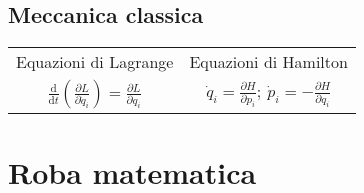 \documentclass{article}
\begin{document}
\subsection*{Meccanica classica}

\begin{tabular}{*{2}{c}}
    Equazioni di Lagrange & Equazioni di Hamilton \\
    $\frac{\mathrm{d}}{\mathrm{d}t}\left(\frac{\partial L}{\partial \dot{q}_i}\right) = \frac{\partial L}{\partial q_i} $ & $\dot{q}_i = \frac{\partial H}{\partial p_i};\ \dot{p}_i = -\frac{\partial H}{\partial q_i} $ \\
\end{tabular}

\section*{Roba matematica}
\end{document}
